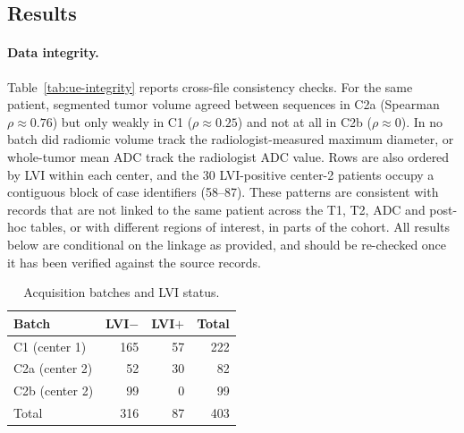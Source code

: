 \subsection{Results}
\label{sec:ue-results}

\paragraph{Data integrity.}
Table~\ref{tab:ue-integrity} reports cross-file consistency checks. For the
same patient, segmented tumor volume agreed between sequences in C2a
(Spearman $\rho\approx0.76$) but only weakly in C1 ($\rho\approx0.25$) and
not at all in C2b ($\rho\approx0$). In no batch did radiomic volume track
the radiologist-measured maximum diameter, or whole-tumor mean ADC track the
radiologist ADC value. Rows are also ordered by LVI within each center, and
the 30 LVI-positive center-2 patients occupy a contiguous block of case
identifiers (58--87). These patterns are consistent with records that are
not linked to the same patient across the T1, T2, ADC and post-hoc tables,
or with different regions of interest, in parts of the cohort. All results
below are conditional on the linkage as provided, and should be re-checked
once it has been verified against the source records.

\begin{table}[htbp]
\centering
\caption{Acquisition batches and LVI status.}
\label{tab:ue-batch}
\begin{tabular}{lrrr}
\toprule
Batch & LVI$-$ & LVI$+$ & Total \\
\midrule
C1 (center 1) & 165 & 57 & 222 \\
C2a (center 2) & 52 & 30 & 82 \\
C2b (center 2) & 99 & 0 & 99 \\
\midrule
Total & 316 & 87 & 403 \\
\bottomrule
\end{tabular}
\end{table}



